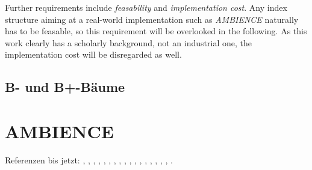 Further requirements include \textit{feasability} and \textit{implementation cost}. Any index structure aiming at a real-world implementation such as \textit{AMBIENCE} naturally has to be feasable, so this requirement will be overlooked in the following. As this work clearly has a scholarly background, not an industrial one, the implementation cost will be disregarded as well.\\ 
\cite{Ottmann2012}
\subsection{B- und B+-Bäume}	
\cite{Knuth1998}	
\section{AMBIENCE}\label{sec:ambience}
Referenzen bis jetzt: \cite{Agarwal2006}, \cite{Ahlgren2012}, \cite{Bayardo2007}, \cite{Byers2002}, \cite{Duerr2010}, \cite{Hellerstein1994}, \cite{Lehman1986}, \cite{Nafe2005}, \cite{Qiao2014}, \cite{Ruppel2014}, \cite{Sarwat2012}, \cite{Schnell2013}, \cite{Schoenfeld2014}, \cite{Shiraki2009}, \cite{Yang2002}, \cite{Zhang2012}, \cite{Zhu2004}, \cite{Jannink1995}.
